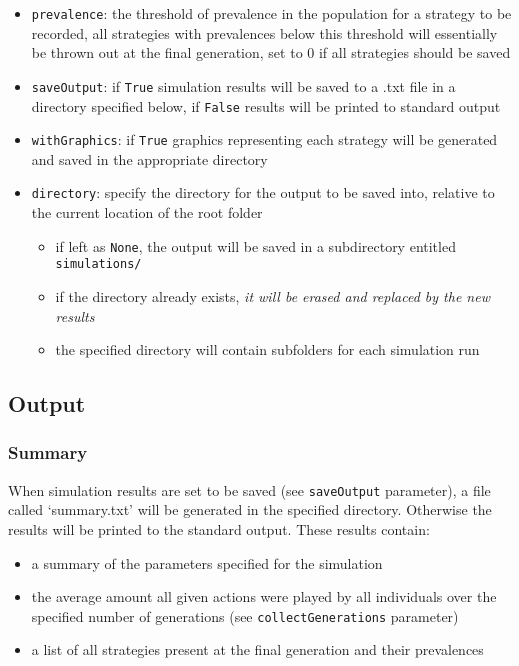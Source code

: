 \documentclass[11pt,twoside]{report}
\begin{document}
\begin{itemize}
\item \texttt{prevalence}: the threshold of prevalence in the population for a strategy to be recorded, all strategies with prevalences below this threshold will essentially be thrown out at the final generation, set to 0 if all strategies should be saved
\item \texttt{saveOutput}: if \texttt{True} simulation results will be saved to a .txt file in a directory specified below, if \texttt{False} results will be printed to standard output
\item \texttt{withGraphics}: if \texttt{True} graphics representing each strategy will be generated and saved in the appropriate directory
\item \texttt{directory}: specify the directory for the output to be saved into, relative to the current location of the root folder
\begin{itemize}
\item if left as \texttt{None}, the output will be saved in a subdirectory entitled \texttt{simulations/}
\item if the directory already exists, \textit{it will be erased and replaced by the new results}
\item the specified directory will contain subfolders for each simulation run 
\end{itemize}
\end{itemize}

\subsection*{Output}

\subsubsection*{Summary}

When simulation results are set to be saved (see \texttt{saveOutput} parameter), a file called `summary.txt' will be generated in the specified directory. Otherwise the results will be printed to the standard output. These results contain:
\begin{itemize}
\item a summary of the parameters specified for the simulation
\item the average amount all given actions were played by all individuals over the specified number of generations (see \texttt{collectGenerations} parameter)
\item a list of all strategies present at the final generation and their prevalences
\end{itemize}
\end{document}

